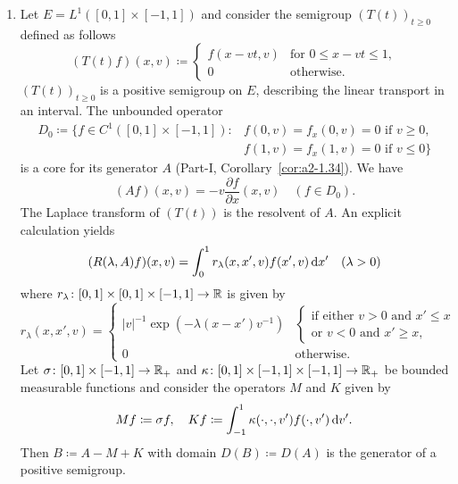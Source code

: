 \begin{examples}
\begin{enumerate}[\upshape (i), wide, labelindent=.25em]
	\item 
	Let $E = L^{1}([0,1] \times[-1,1] )$ and consider the semigroup $(T(t))_{t\geq 0}$ defined as follows
	\begin{equation}\label{eq:c3-3.3}
		(T(t)f)(x,v) \coloneq \begin{cases}
			f(x-vt,v) & \text{for } 0 \leq x-vt \leq 1  , \\
			0 & \text{otherwise}.
		\end{cases}
	\end{equation}
		$(T(t))_{t\geq 0}$ is a positive semigroup on $E$, describing the linear transport%
        in an interval. The unbounded operator 
	\begin{align*}\label{eq:c3-D0}
		D_{0} \coloneq \{f \in C^{1}([0,1]\times[-1,1]) \colon  
		& f(0,v) = f_{x}(0,v) = 0 \text{ if } v \geq 0 , \\ 
		& f(1,v) = f_{x}(1,v) = 0 \text{ if } v \leq 0\}
	\end{align*}
	is a core%
    for its generator $A$ (\cf Part-I, Corollary~\ref{cor:a2-1.34}).
	We have
	\begin{equation}\label{eq:c3-3.4}
		(Af)(x,v) = -v\frac{\partial f}{\partial x}(x,v) \quad (f \in D_{0}).
	\end{equation}
	The Laplace transform of\/ $(T(t))$ is the resolvent of\/ $A$.
	An explicit calculation yields
	\begin{equation}\label{eq:c3-3.5}
		(R(\lambda,A)f)(x,v) = \int_{0}^{1} r_{\lambda}(x,x',v)f(x',v)\mathop{}\!\mathrm{d}{x}' \quad (\lambda > 0)
	\end{equation}
	where $r_{\lambda} \colon [0,1] \times [0,1] \times [-1,1] \to \mathbb{R} $ is given by
	\begin{equation*}\label{eq:c3-r_lambda}
		r_{\lambda}(x,x',v) = \begin{cases}
			|v|^{-1}\exp(-\lambda(x-x')v^{-1}) & 
			\begin{cases}\text{if either } v>0 \text{ and } x'\leq x \\
		    \text{or } v<0 \text{ and } x'\geq x, 
		    \end{cases}\\
			0 & \text{otherwise}.
		\end{cases}
	\end{equation*}
	Let $\sigma \colon [0,1]\times[-1,1] \to \mathbb{R} _{+}$ and $\kappa \colon [0,1]\times[-1,1]\times[-1,1] \to \mathbb{R} _{+}$ be bounded measurable functions and consider the operators $M$ and $K$ given by
	\begin{equation}\label{eq:c3-3.6}
		Mf \coloneq \sigma f, \quad Kf \coloneq \int_{-1}^{1} \kappa(\cdot,\cdot,v')f(\cdot,v') \mathop{}\!\mathrm{d}{v'}.
	\end{equation}
	Then $B \coloneq A - M + K$ with domain $D(B) \coloneq D(A)$ is the generator of a positive semigroup.
	

\end{enumerate}
\end{examples}
